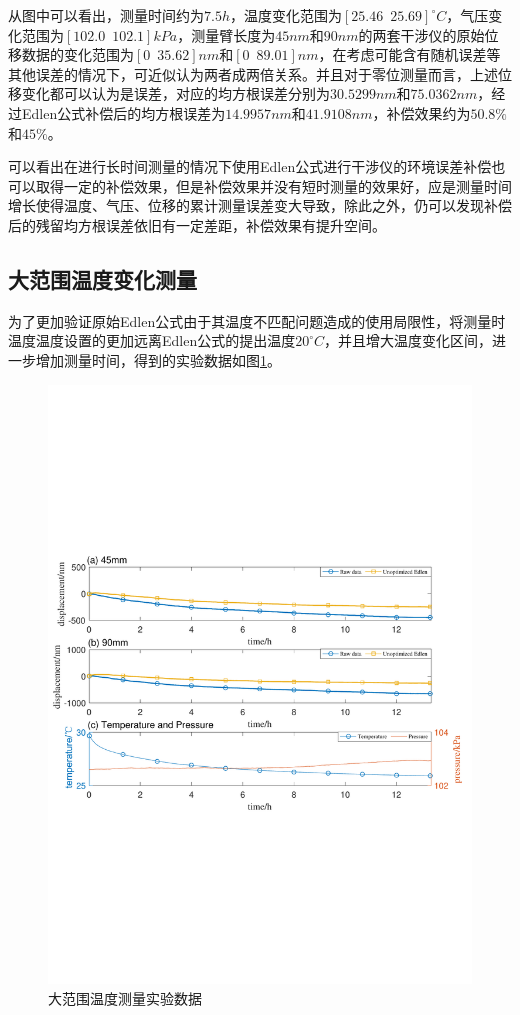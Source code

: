 从图中可以看出，测量时间约为$7.5h$，温度变化范围为$[25.46\,\,\,25.69]^{\circ}C$，气压变化范围为$[102.0\,\,\,102.1]kPa$，测量臂长度为$45nm$和$90nm$的两套干涉仪的原始位移数据的变化范围为$[0\,\,\,35.62]nm$和$[0\,\,\,89.01]nm$，在考虑可能含有随机误差等其他误差的情况下，可近似认为两者成两倍关系。并且对于零位测量而言，上述位移变化都可以认为是误差，对应的均方根误差分别为$30.5299nm$和$75.0362nm$，经过Edlen公式补偿后的均方根误差为$14.9957nm$和$41.9108nm$，补偿效果约为$50.8\%$和$45\%$。

可以看出在进行长时间测量的情况下使用Edlen公式进行干涉仪的环境误差补偿也可以取得一定的补偿效果，但是补偿效果并没有短时测量的效果好，应是测量时间增长使得温度、气压、位移的累计测量误差变大导致，除此之外，仍可以发现补偿后的残留均方根误差依旧有一定差距，补偿效果有提升空间。

\subsection{大范围温度变化测量}
为了更加验证原始Edlen公式由于其温度不匹配问题造成的使用局限性，将测量时温度温度设置的更加远离Edlen公式的提出温度$20^{\circ}C$，并且增大温度变化区间，进一步增加测量时间，得到的实验数据如图\ref{fig:大范围温度测量实验数据}。
\begin{figure}[htb]
    \centering
    \includegraphics[width=14cm]{fig/3-fig/大范围温度测量实验数据.pdf}
    \caption{大范围温度测量实验数据}
    \label{fig:大范围温度测量实验数据}
  \end{figure}
